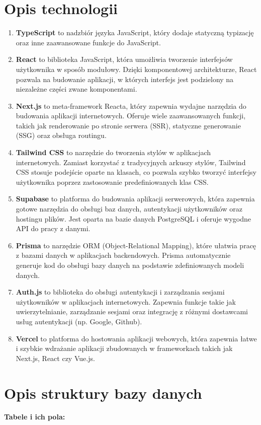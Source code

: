\documentclass[12pt]{article}
\begin{document}
\section{Opis technologii}
\begin{enumerate}[label=\textbf{\arabic*.}]
	\item \textbf{TypeScript} to nadzbiór języka JavaScript, który dodaje statyczną typizację oraz inne zaawansowane funkcje do JavaScript.
	\item \textbf{React} to biblioteka JavaScript, która umożliwia tworzenie interfejsów użytkownika w sposób modułowy. Dzięki komponentowej architekturze, React pozwala na budowanie aplikacji, w których interfejs jest podzielony na niezależne części zwane komponentami.
	\item \textbf{Next.js} to meta-framework Reacta, który zapewnia wydajne narzędzia do budowania aplikacji internetowych. Oferuje wiele zaawansowanych funkcji, takich jak renderowanie po stronie serwera (SSR), statyczne generowanie (SSG) oraz obsługa routingu.
	\item \textbf{Tailwind CSS} to narzędzie do tworzenia stylów w aplikacjach internetowych. Zamiast korzystać z tradycyjnych arkuszy stylów, Tailwind CSS stosuje podejście oparte na klasach, co pozwala szybko tworzyć interfejsy użytkownika poprzez zastosowanie predefiniowanych klas CSS.
	\item \textbf{Supabase} to platforma do budowania aplikacji serwerowych, która zapewnia gotowe narzędzia do obsługi baz danych, autentykacji użytkowników oraz hostingu plików. Jest oparta na bazie danych PostgreSQL i oferuje wygodne API do pracy z danymi.
	\item \textbf{Prisma} to narzędzie ORM (Object-Relational Mapping), które ułatwia pracę z bazami danych w aplikacjach backendowych. Prisma automatycznie generuje kod do obsługi bazy danych na podstawie zdefiniowanych modeli danych.
	\item \textbf{Auth.js} to biblioteka do obsługi autentykacji i zarządzania sesjami użytkowników w aplikacjach internetowych. Zapewnia funkcje takie jak uwierzytelnianie, zarządzanie sesjami oraz integrację z różnymi dostawcami usług autentykacji (np. Google, Github).
	\item \textbf{Vercel} to platforma do hostowania aplikacji webowych, która zapewnia łatwe i szybkie wdrażanie aplikacji zbudowanych w frameworkach takich jak Next.js, React czy Vue.js.
\end{enumerate}

\section{Opis struktury bazy danych}
\noindent\hspace{0.5cm}\textbf{\large Tabele i ich pola:}\vspace{0.3cm}
\end{document}
